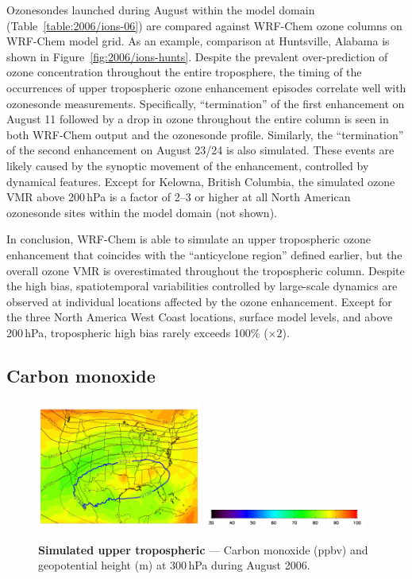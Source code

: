 Ozonesondes launched during August within the model domain (Table~\ref{table:2006/ions-06}) are compared against WRF-Chem ozone columns on
WRF-Chem model grid. As an example, comparison at Huntsville, Alabama is shown in \mbox{Figure~\ref{fig:2006/ions-hunts}}. Despite the prevalent over-prediction
of ozone concentration throughout the entire troposphere, the timing of the occurrences of upper tropospheric ozone enhancement episodes correlate well
with ozonesonde measurements. Specifically, ``termination'' of the first enhancement on August 11 followed by a drop in ozone throughout the entire column
is seen in both WRF-Chem output and the ozonesonde profile. Similarly, the ``termination'' of the second enhancement on August 23/24 is also simulated. These
events are likely caused by the synoptic movement of the enhancement, controlled by dynamical features. Except for Kelowna, British Columbia, the simulated
ozone VMR above 200\,\unit{hPa} is a factor of 2--3 or higher at all North American ozonesonde sites within the model domain (not shown).

In conclusion, WRF-Chem is able to simulate an upper tropospheric ozone enhancement that coincides with the ``anticyclone region'' defined earlier, but the
overall ozone VMR is overestimated throughout the tropospheric column. Despite the high bias, spatiotemporal variabilities controlled by
large-scale dynamics are observed at individual locations affected by the ozone enhancement. Except for the three North America West Coast locations,
surface model levels, and above 200\,\unit{hPa}, tropospheric high bias rarely exceeds 100\% ($\times2$).

\subsection{Carbon monoxide}\label{ssec:2006/gen/co}

	\begin{figure}
		\centering
		\begin{singlespacing}
		\vspace{-.15in}
		\includegraphics[width=0.48\textwidth]{co/co08_300hPa}
		\includegraphics[width=0.48\textwidth]{o3/o3_colorbar}
		\caption[Simulated August  at 300\,\unit{hPa}]{{\small\textbf{Simulated upper tropospheric } --- Carbon monoxide
		(\unit{ppbv}) and geopotential height (\unit{m}) at 300\,\unit{hPa} during August 2006.}}
		\label{fig:2006/co_300}
		\end{singlespacing}
	\end{figure}
	
